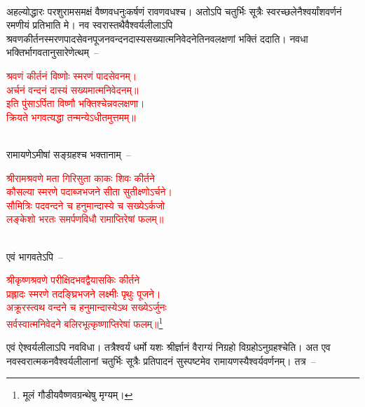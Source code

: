 \\
\begin{sloppypar}\justifying\noindent अहल्योद्धारः परशुराम\-समक्षं वैष्णव\-धनुः\-कर्षणं रावण\-वधश्च। अतोऽपि चतुर्भिः सूत्रैः स्वरच्छलेनैश्वर्यांश\-वर्णनं रमणीयं प्रतिभाति मे। नव स्वरास्तथैवैश्वर्य\-लीलाऽपि श्रवण\-कीर्तन\-स्मरण\-पाद\-सेवन\-पूजन\-वन्दन\-दास्य\-सख्यात्म\-निवेदनेति\-नव\-लक्षणां भक्तिं ददाति। नवधा भक्तिर्भागवतानु\-सारेणेत्थम्~–\end{sloppypar}
\centering\textcolor{red}{श्रवणं कीर्तनं विष्णोः स्मरणं पादसेवनम्।\nopagebreak\\
अर्चनं वन्दनं दास्यं सख्यमात्मनिवेदनम्॥\nopagebreak\\
इति पुंसाऽर्पिता विष्णौ भक्तिश्चेन्नवलक्षणा।\nopagebreak\\
क्रियते भगवत्यद्धा तन्मन्येऽधीतमुत्तमम्॥}\nopagebreak\\
\\
\begin{sloppypar}\justifying\noindent रामायणेऽमीषां सङ्ग्रहश्च भक्तानाम्~–\end{sloppypar}
\centering\textcolor{red}{श्रीरामश्रवणे मता गिरिसुता काकः शिवः कीर्तने\nopagebreak\\
कौसल्या स्मरणे पदाब्जभजने सीता सुतीक्ष्णोऽर्चने।\nopagebreak\\
सौमित्रिः पदवन्दने च हनुमान्दास्ये च सख्येऽर्कजो\nopagebreak\\
लङ्केशो भरतः समर्पणविधौ रामाप्तिरेषां फलम्॥}\nopagebreak\\
\\
\begin{sloppypar}\justifying\noindent एवं भागवतेऽपि~–\end{sloppypar}
\centering\textcolor{red}{श्रीकृष्णश्रवणे परीक्षिदभवद्वैयासकिः कीर्तने\nopagebreak\\
प्रह्लादः स्मरणे तदङ्घ्रिभजने लक्ष्मीः पृथुः पूजने।\nopagebreak\\
अक्रूरस्त्वथ वन्दने च हनुमान्दास्येऽथ सख्येऽर्जुनः\nopagebreak\\
सर्वस्वात्मनिवेदने बलिरभूत्कृष्णाप्तिरेषां फलम्॥}\footnote{मूलं गौडीय\-वैष्णव\-ग्रन्थेषु मृग्यम्।}\\ 
\begin{sloppypar}\justifying\noindent एवं ऐश्वर्य\-लीलाऽपि नव\-विधा। तत्रैश्वर्यं धर्मो यशः श्रीर्ज्ञानं वैराग्यं निग्रहो विग्रहोऽनुग्रहश्चेति। अत एव नव\-स्वरात्मक\-नवैश्वर्य\-लीलानां चतुर्भिः सूत्रैः प्रतिपादनं सुस्पष्टमेव रामायणस्यैश्वर्य\-वर्णनम्। तत्र~–\end{sloppypar}
